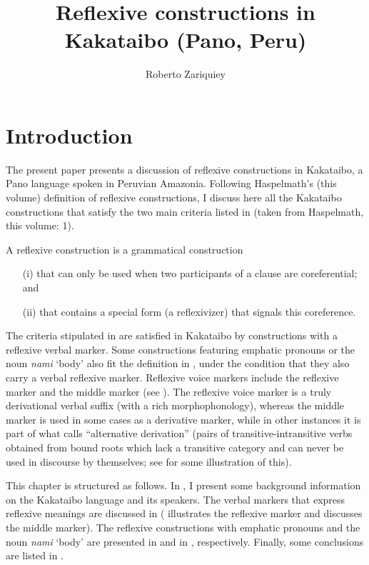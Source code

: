 \documentclass[output=paper,colorlinks,citecolor=brown,modfonts,nonflat]{langscibook}
\author{Roberto Zariquiey\affiliation{Pontificia Universidad Católica del Perú}}
\title{Reflexive constructions in Kakataibo (Pano, Peru)}
\begin{document}
\maketitle 

\section{Introduction}\label{sec:zariquiey:1}

The present paper presents a discussion of reflexive constructions in Kakataibo, a Pano language spoken in Peruvian Amazonia. Following Haspelmath’s (this volume) definition of reflexive constructions, I discuss here all the Kakataibo constructions that satisfy the two main criteria listed in  (taken from Haspelmath, this volume: 1).

\ea%
    \label{ex:zariquiey:1}
    A reflexive construction is a grammatical construction\\
    \begin{itemize}
        \item[(i)] that can only be used when two participants of a clause are coreferential; and 
        \item[(ii)] that contains a special form (a reflexivizer) that signals this coreference.
    \end{itemize}
\z

The criteria stipulated in  are satisfied in Kakataibo by constructions with a reflexive verbal marker. Some constructions featuring emphatic pronouns or the noun \textit{nami} ‘body’ also fit the definition in , under the condition that they also carry a verbal reflexive marker. Reflexive voice markers include the reflexive marker and the middle marker (see \citealt[306ff]{Zariquiey2018}). The reflexive voice marker is a truly derivational verbal suffix (with a rich morphophonology), whereas the middle marker is used in some cases as a derivative marker, while in other instances it is part of what \citet[416ss]{Valenzuela2017} calls “alternative derivation” (pairs of transitive-intransitive verbs obtained from bound roots which lack a transitive category and can never be used in discourse by themselves; see  for some illustration of this). 

This chapter is structured as follows. In , I present some background information on the Kakataibo language and its speakers. The verbal markers that express reflexive meanings are discussed in  ( illustrates the reflexive marker and  discusses the middle marker). The reflexive constructions with emphatic pronouns and the noun \textit{nami} ‘body’ are presented in  and in , respectively. Finally, some conclusions are listed in . 
\end{document}
